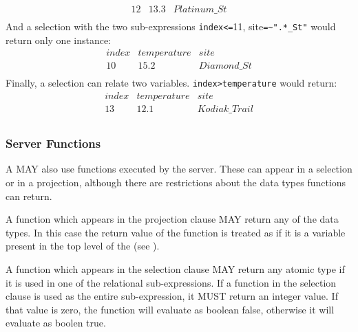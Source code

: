 \documentclass[justify]{nasa-ese}
\begin{document}
\begin{description}
\begin{displaymath}
\begin{array}{ccc}
        12 & 13.3 & Platinum\_St \\
      \end{array}
    \end{displaymath}
    And a selection with the two sub-expressions \verb+index<=+11, 
    site\verb+=~".*_St"+ would return only one instance:
    \begin{displaymath}
      \begin{array}{ccc}
        index & temperature & site \\
        10 & 15.2 & Diamond\_St \\
      \end{array}
    \end{displaymath}
    Finally, a selection can relate two variables.
    \verb+index>temperature+ would return:
    \begin{displaymath}
      \begin{array}{ccc}
        index & temperature & site \\
        13 & 12.1 & Kodiak\_Trail \\
      \end{array}
    \end{displaymath}

\end{description}

\subsubsection{Server Functions}
\label{sec-ce-functions}

A \CE MAY also use functions executed by the server. These can appear in a
selection or in a projection, although there are restrictions about the data
types functions can return. 


A function which appears in the projection clause MAY return any of the \DAP
data types. In this case the return value of the function is treated as if it
is a variable present in the top level of the \Dataset (see
). 

A function which appears in the selection clause MAY return any atomic type
if it is used in one of the relational sub-expressions. If a function in the
selection clause is used as the entire sub-expression, it MUST return an
integer value. If that value is zero, the function will evaluate as boolean
false, otherwise it will evaluate as boolen true.
\end{document}
